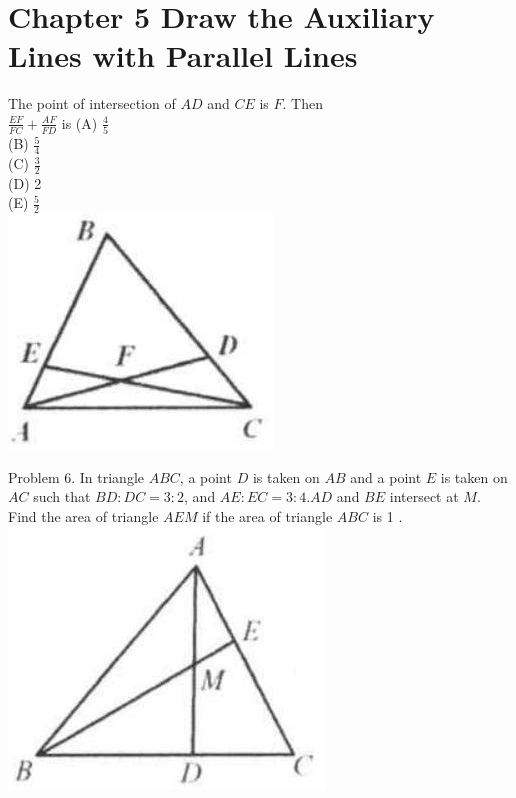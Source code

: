 \documentclass[10pt]{article}
\begin{document}
\section*{Chapter 5 Draw the Auxiliary Lines with Parallel Lines}
The point of intersection of \(A D\) and \(C E\) is \(F\). Then\\
\(\frac{E F}{F C}+\frac{A F}{F D}\) is (A) \(\frac{4}{5}\)\\
(B) \(\frac{5}{4}\)\\
(C) \(\frac{3}{2}\)\\
(D) 2\\
(E) \(\frac{5}{2}\)\\
\includegraphics[max width=\textwidth, center]{2025_04_17_97bc1f7e44d93c271a88g-127}

Problem 6. In triangle \(A B C\), a point \(D\) is taken on \(A B\) and a point \(E\) is taken on \(A C\) such that \(B D: D C=3: 2\), and \(A E: E C=3: 4 . A D\) and \(B E\) intersect at \(M\). Find the area of triangle \(A E M\) if the area of triangle \(A B C\) is 1 .\\
\includegraphics[max width=\textwidth, center]{2025_04_17_97bc1f7e44d93c271a88g-127(3)}
\end{document}

